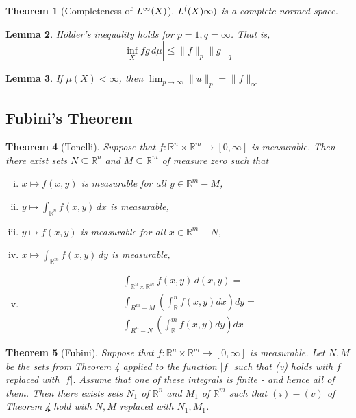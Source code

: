 \documentclass[10pt, oneside, reqno]{amsart}
\theoremstyle{plain}%
\newtheorem{thm}{Theorem}[section]
\newtheorem{lem}[thm]{Lemma}
\theoremstyle{definition}
\theoremstyle{remark}
\newcommand{\R}{\mathbb{R}}
\newcommand{\dmu}{\, d \mu}
\begin{document}
\begin{thm}[Completeness of $L^{\infty}(X)$]
	$L^{(}(X)\infty)$ is a complete normed space.
\end{thm}

\begin{lem}
	H\"older's inequality holds for $p = 1, q = \infty$.  That is, \[
		| \inf_X fg \dmu | \leq \|f \|_p \|g \|_q
	\]
\end{lem}

\begin{lem}
	If $\mu(X) < \infty$, then $\lim_{p \rightarrow \infty} \|u\|_p = \|f\|_\infty$
\end{lem}


\subsection{Fubini's Theorem} %
\label{sub:fubini_s_theorem}

\begin{thm}[Tonelli]\label{tonelli}
	Suppose that $f: \R^n \times \R^m \rightarrow [0,\infty]$ is measurable. Then there exist sets $N \subseteq \R^n$ and $M \subseteq \R^m$ of measure zero such that 
	
	\begin{enumerate}[(i)]
		\item $x \mapsto f(x,y)$ is measurable for all $y \in \R^m - M$,
		\item $y \mapsto \int_{\R^n} f(x,y) \, dx$ is measurable,
		\item $y \mapsto f(x,y)$ is measurable for all $x \in \R^m - N$,
		\item $x \mapsto \int_{\R^m} f(x,y) \, dy$ is measurable,
		\item  \begin{align*}
			&\int_{\R^n \times \R^m}f(x,y)\, d(x,y) = \\
			&\int_{R^m-M} \left( \int_\R^n f(x,y) dx \right) dy = \\
			&\int_{R^n-N} \left( \int_\R^m f(x,y) dy \right) dx
		\end{align*}
	\end{enumerate}
\end{thm}

\begin{thm}[Fubini]
	Suppose that $f: \R^n \times \R^m \rightarrow [0,\infty]$ is measurable. Let $N,M$ be the sets from Theorem \ref{tonelli} applied to the function $|f| $ such that (v) holds with $f$ replaced with $|f|$.  Assume that one of these integrals is finite - and hence all of them.  Then there exists sets $N_1$ of $\R^n$ and $M_1$ of $\R^m$ such that $(i) - (v)$ of Theorem \ref{tonelli} hold with $N,M$ replaced with $N_1, M_1$.
\end{thm}
\end{document}
